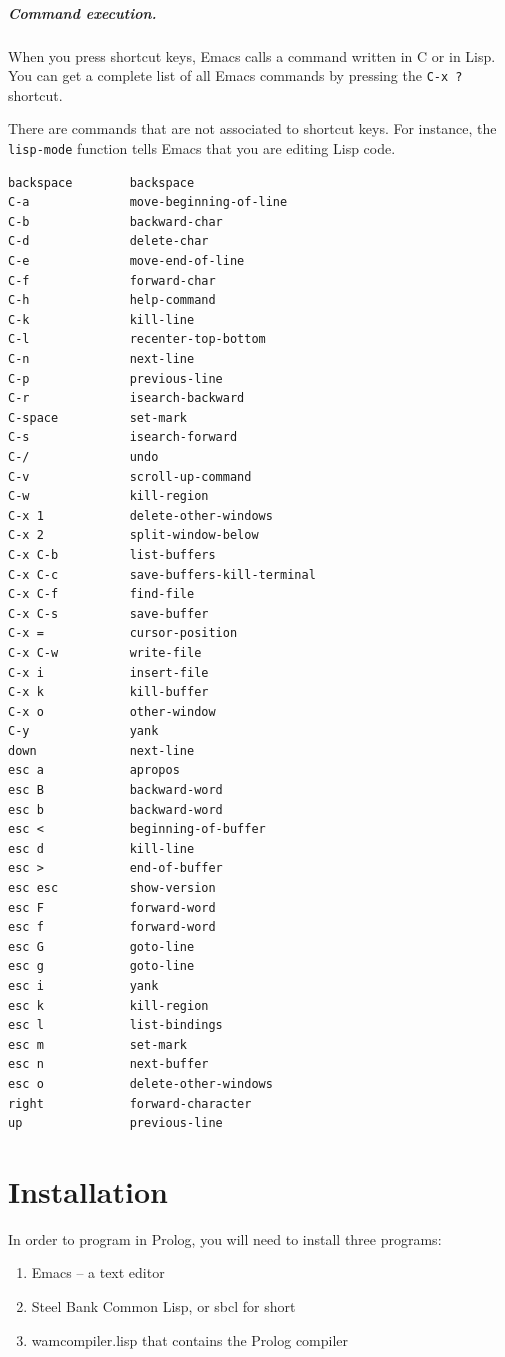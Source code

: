 \documentclass[a4paper,12pt]{book}
\begin{document}
\paragraph{Command execution.} When you press 
shortcut keys, Emacs calls a command written in
C or in Lisp. You can get a complete list of all
Emacs commands by pressing the \verb|C-x ?| shortcut.

There are commands that are not associated to
 shortcut keys. For instance, the \verb|lisp-mode|
function tells Emacs that you are editing Lisp code. 

\begin{verbatim}
backspace        backspace
C-a              move-beginning-of-line
C-b              backward-char
C-d              delete-char
C-e              move-end-of-line
C-f              forward-char
C-h              help-command
C-k              kill-line
C-l              recenter-top-bottom
C-n              next-line
C-p              previous-line
C-r              isearch-backward
C-space          set-mark
C-s              isearch-forward
C-/              undo
C-v              scroll-up-command
C-w              kill-region
C-x 1            delete-other-windows
C-x 2            split-window-below
C-x C-b          list-buffers
C-x C-c          save-buffers-kill-terminal
C-x C-f          find-file
C-x C-s          save-buffer
C-x =            cursor-position
C-x C-w          write-file
C-x i            insert-file
C-x k            kill-buffer
C-x o            other-window
C-y              yank
down             next-line
esc a            apropos
esc B            backward-word
esc b            backward-word
esc <            beginning-of-buffer
esc d            kill-line
esc >            end-of-buffer
esc esc          show-version
esc F            forward-word
esc f            forward-word
esc G            goto-line
esc g            goto-line
esc i            yank
esc k            kill-region
esc l            list-bindings
esc m            set-mark
esc n            next-buffer
esc o            delete-other-windows
right            forward-character
up               previous-line
\end{verbatim}

\chapter{Installation}  
In order to program in Prolog, you will need
to install three programs:
\begin{enumerate}
\item Emacs -- a text editor
\item Steel Bank Common Lisp, or sbcl for
 short
\item wamcompiler.lisp that contains the Prolog compiler
\end{enumerate}
\end{document}
